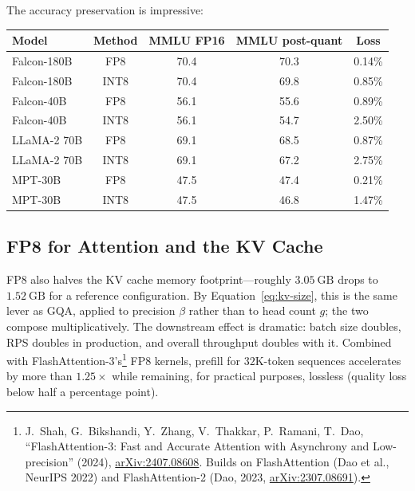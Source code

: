 \documentclass[11pt,a4paper]{article}
\theoremstyle{definition}
\theoremstyle{remark}
\theoremstyle{plain}
\newcommand{\arxivlink}[1]{\href{https://arxiv.org/abs/#1}{arXiv:#1}}
\begin{document}
The accuracy preservation is impressive:

\begin{center}
\renewcommand{\arraystretch}{1.25}
\begin{tabular}{@{}lcccc@{}}
\toprule
\textbf{Model} & \textbf{Method} & \textbf{MMLU FP16} & \textbf{MMLU post-quant} & \textbf{Loss} \\
\midrule
Falcon-180B & FP8  & 70.4 & 70.3 & 0.14\% \\
Falcon-180B & INT8 & 70.4 & 69.8 & 0.85\% \\
Falcon-40B  & FP8  & 56.1 & 55.6 & 0.89\% \\
Falcon-40B  & INT8 & 56.1 & 54.7 & 2.50\% \\
LLaMA-2 70B & FP8  & 69.1 & 68.5 & 0.87\% \\
LLaMA-2 70B & INT8 & 69.1 & 67.2 & 2.75\% \\
MPT-30B     & FP8  & 47.5 & 47.4 & 0.21\% \\
MPT-30B     & INT8 & 47.5 & 46.8 & 1.47\% \\
\bottomrule
\end{tabular}
\end{center}

\subsection{FP8 for Attention and the KV Cache}

FP8 also halves the KV cache memory footprint---roughly $3.05~\text{GB}$
drops to $1.52~\text{GB}$ for a reference configuration. By
Equation~\eqref{eq:kv-size}, this is the same lever as GQA, applied to
precision $\beta$ rather than to head count $g$; the two compose
multiplicatively. The downstream effect is dramatic: batch size doubles,
RPS doubles in production, and overall throughput doubles with it.
Combined with FlashAttention-3's\footnote{J.\ Shah, G.\ Bikshandi,
Y.\ Zhang, V.\ Thakkar, P.\ Ramani, T.\ Dao, ``FlashAttention-3: Fast and
Accurate Attention with Asynchrony and Low-precision'' (2024),
\arxivlink{2407.08608}. Builds on FlashAttention (Dao et al., NeurIPS
2022) and FlashAttention-2 (Dao, 2023, \arxivlink{2307.08691}).} FP8
kernels, prefill for $32\text{K}$-token sequences accelerates by more than
$1.25\times$ while remaining, for practical purposes, lossless (quality
loss below half a percentage point).
\end{document}
